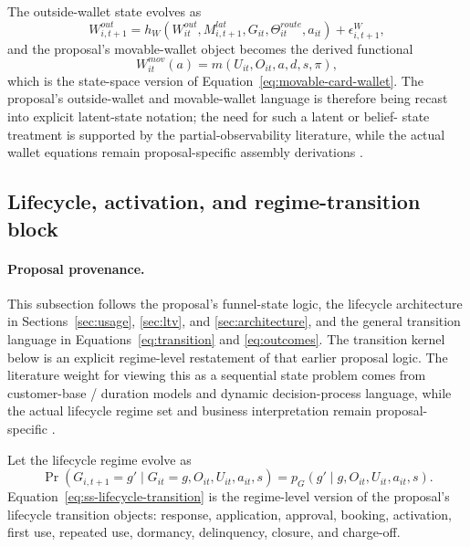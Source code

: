 \documentclass[11pt]{article}
\newcommand{\1}{\mathbf{1}}
\begin{document}
The outside-wallet state evolves as
\begin{equation}
  W^{out}_{i,t+1}
  =
  h_W(W^{out}_{it},M^{lat}_{i,t+1},G_{it},\Theta^{route}_{it},a_{it})
  + \epsilon^W_{i,t+1},
  \label{eq:ss-outside-wallet-transition}
\end{equation}
and the proposal's movable-wallet object becomes the derived functional
\begin{equation}
  W^{mov}_{it}(a)
  =
  m(U_{it},O_{it},a,d,s,\pi),
  \label{eq:ss-movable-wallet}
\end{equation}
which is the state-space version of Equation~\eqref{eq:movable-card-wallet}.
The proposal's outside-wallet and movable-wallet language is therefore being
recast into explicit latent-state notation; the need for such a latent or belief-
state treatment is supported by the partial-observability literature, while the
actual wallet equations remain proposal-specific assembly derivations
\citep{smallwood1973pomdp,kaelbling1998pomdp}.

\subsection{Lifecycle, activation, and regime-transition block}
\label{subsec:state-space-lifecycle-block}

\paragraph{Proposal provenance.}
This subsection follows the proposal's funnel-state logic, the lifecycle
architecture in Sections~\ref{sec:usage}, \ref{sec:ltv}, and
\ref{sec:architecture}, and the general transition language in
Equations~\eqref{eq:transition} and \eqref{eq:outcomes}. The transition kernel
below is an explicit regime-level restatement of that earlier proposal logic.
The literature weight for viewing this as a sequential state problem comes from
customer-base / duration models and dynamic decision-process language, while the
actual lifecycle regime set and business interpretation remain proposal-specific
\citep{schmittlein1987counting,fader2005bgnbd,bolton1998duration,
puterman1994mdp,murphy2003dynamic}.

Let the lifecycle regime evolve as
\begin{equation}
  \Pr(G_{i,t+1}=g'\mid G_{it}=g,O_{it},U_{it},a_{it},s)
  = p_G(g'\mid g,O_{it},U_{it},a_{it},s).
  \label{eq:ss-lifecycle-transition}
\end{equation}
Equation~\eqref{eq:ss-lifecycle-transition} is the regime-level version of the
proposal's lifecycle transition objects: response, application, approval,
booking, activation, first use, repeated use, dormancy, delinquency, closure,
and charge-off.
\end{document}
